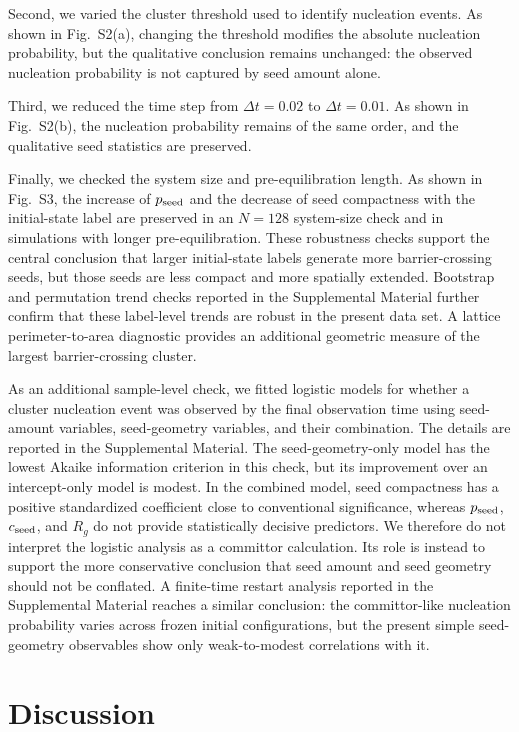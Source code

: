 ﻿\documentclass[aps,pre,preprint,showkeys,amsmath,amssymb,superscriptaddress,longbibliography]{revtex4-2}
\begin{document}
Second, we varied the cluster threshold used to identify nucleation events. As shown in Fig.~S2(a), changing the threshold modifies the absolute nucleation probability, but the qualitative conclusion remains unchanged: the observed nucleation probability is not captured by seed amount alone.

Third, we reduced the time step from $\Delta t=0.02$ to $\Delta t=0.01$. As shown in Fig.~S2(b), the nucleation probability remains of the same order, and the qualitative seed statistics are preserved.

Finally, we checked the system size and pre-equilibration length. As shown in Fig.~S3, the increase of $p_{\rm seed}$ and the decrease of seed compactness with the initial-state label are preserved in an $N=128$ system-size check and in simulations with longer pre-equilibration. These robustness checks support the central conclusion that larger initial-state labels generate more barrier-crossing seeds, but those seeds are less compact and more spatially extended. Bootstrap and permutation trend checks reported in the Supplemental Material further confirm that these label-level trends are robust in the present data set. A lattice perimeter-to-area diagnostic provides an additional geometric measure of the largest barrier-crossing cluster.

As an additional sample-level check, we fitted logistic models for whether a cluster nucleation event was observed by the final observation time using seed-amount variables, seed-geometry variables, and their combination. The details are reported in the Supplemental Material. The seed-geometry-only model has the lowest Akaike information criterion in this check, but its improvement over an intercept-only model is modest. In the combined model, seed compactness has a positive standardized coefficient close to conventional significance, whereas $p_{\rm seed}$, $c_{\rm seed}$, and $R_g$ do not provide statistically decisive predictors. We therefore do not interpret the logistic analysis as a committor calculation. Its role is instead to support the more conservative conclusion that seed amount and seed geometry should not be conflated. A finite-time restart analysis reported in the Supplemental Material reaches a similar conclusion: the committor-like nucleation probability varies across frozen initial configurations, but the present simple seed-geometry observables show only weak-to-modest correlations with it.

\section{Discussion}\label{discussion}
\end{document}
